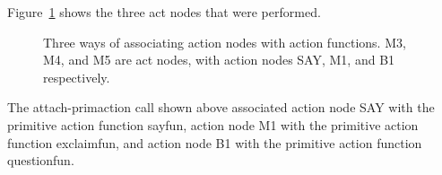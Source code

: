 \documentclass{book}
\newcommand{\ct}[1]{{\ttfamily #1}} %
\begin{document}
Figure~\ref{snerefig1} shows the three act nodes that were performed.
\begin{figure}[tbp]
\vspace{1in}
\caption{Three ways of associating action nodes with action
functions. \ct{M3}, \ct{M4}, and \ct{M5} are act nodes, with action
nodes \ct{SAY}, \ct{M1}, and \ct{B1} respectively.}\label{snerefig1}
\end{figure}
The \ct{attach-primaction} call shown above associated action node \ct{SAY}
with the primitive action function \ct{sayfun}, action node \ct{M1}
with the primitive action function \ct{exclaimfun}, and action node
\ct{B1} with the primitive action function \ct{questionfun}.
\end{document}
